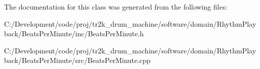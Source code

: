 The documentation for this class was generated from the following files\+:\begin{DoxyCompactItemize}
\item 
C\+:/\+Development/code/proj/tr2k\+\_\+drum\+\_\+machine/software/domain/\+Rhythm\+Playback/\+Beats\+Per\+Minute/inc/Beats\+Per\+Minute.\+h\item 
C\+:/\+Development/code/proj/tr2k\+\_\+drum\+\_\+machine/software/domain/\+Rhythm\+Playback/\+Beats\+Per\+Minute/src/Beats\+Per\+Minute.\+cpp\end{DoxyCompactItemize}
